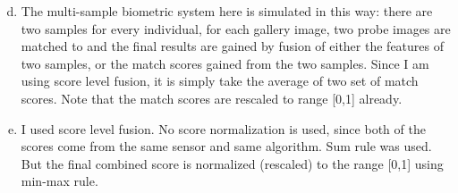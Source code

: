 \documentclass[a4paper]{article}
\begin{document}
\begin{spacing}{2.0}
	\begin{enumerate}[(a)]
	\setcounter{enumi}{3}
	\item The multi-sample biometric system here is simulated in this way: there are two samples for every individual, for each gallery image, two probe images are matched to and the final results are gained by fusion of either the features of two samples, or the match scores gained from the two samples. Since I am using score level fusion, it is simply take the average of two set of match scores. Note that the match scores are rescaled to range [0,1] already.
	\item I used score level fusion. No score normalization is used, since both of the scores come from the same sensor and same algorithm. Sum rule was used. But the final combined score is normalized (rescaled) to the range [0,1] using min-max rule.
	\end{enumerate}
	

\end{spacing}
\end{document}
